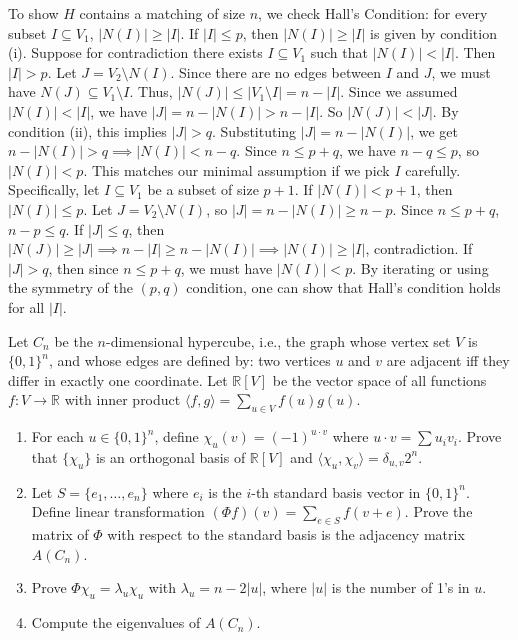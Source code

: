 \begin{solution}
To show $H$ contains a matching of size $n$, we check Hall's Condition: for every subset $I \subseteq V_1$, $|N(I)| \geq |I|$.
If $|I| \leq p$, then $|N(I)| \geq |I|$ is given by condition (i).
Suppose for contradiction there exists $I \subseteq V_1$ such that $|N(I)| < |I|$. Then $|I| > p$.
Let $J = V_2 \setminus N(I)$. Since there are no edges between $I$ and $J$, we must have $N(J) \subseteq V_1 \setminus I$.
Thus, $|N(J)| \leq |V_1 \setminus I| = n - |I|$.
Since we assumed $|N(I)| < |I|$, we have $|J| = n - |N(I)| > n - |I|$.
So $|N(J)| < |J|$. By condition (ii), this implies $|J| > q$.
Substituting $|J| = n - |N(I)|$, we get $n - |N(I)| > q \implies |N(I)| < n - q$.
Since $n \leq p + q$, we have $n - q \leq p$, so $|N(I)| < p$. This matches our minimal assumption if we pick $I$ carefully.
Specifically, let $I \subseteq V_1$ be a subset of size $p+1$. If $|N(I)| < p+1$, then $|N(I)| \leq p$.
Let $J = V_2 \setminus N(I)$, so $|J| = n - |N(I)| \geq n - p$.
Since $n \le p+q$, $n-p \le q$. If $|J| \le q$, then $|N(J)| \ge |J| \implies n - |I| \ge n - |N(I)| \implies |N(I)| \ge |I|$, contradiction.
If $|J| > q$, then since $n \le p+q$, we must have $|N(I)| < p$.
By iterating or using the symmetry of the $(p,q)$ condition, one can show that Hall's condition holds for all $|I|$.
\end{solution}

\begin{exercise}
\label{applied:2018:7}
Let $C_n$ be the $n$-dimensional hypercube, i.e., the graph whose vertex set $V$ is $\{0, 1\}^n$, and whose edges are defined by: two vertices $u$ and $v$ are adjacent iff they differ in exactly one coordinate. Let $\mathbb{R}[V]$ be the vector space of all functions $f: V \to \mathbb{R}$ with inner product $\langle f, g \rangle = \sum_{u \in V} f(u)g(u)$.
\begin{enumerate}
    \item For each $u \in \{0, 1\}^n$, define $\chi_u(v) = (-1)^{u \cdot v}$ where $u \cdot v = \sum u_i v_i$. Prove that $\{\chi_u\}$ is an orthogonal basis of $\mathbb{R}[V]$ and $\langle \chi_u, \chi_v \rangle = \delta_{u, v} 2^n$.
    \item Let $S = \{e_1, \dots, e_n\}$ where $e_i$ is the $i$-th standard basis vector in $\{0, 1\}^n$. Define linear transformation $(\Phi f)(v) = \sum_{e \in S} f(v + e)$. Prove the matrix of $\Phi$ with respect to the standard basis is the adjacency matrix $A(C_n)$.
    \item Prove $\Phi \chi_u = \lambda_u \chi_u$ with $\lambda_u = n - 2|u|$, where $|u|$ is the number of 1's in $u$.
    \item Compute the eigenvalues of $A(C_n)$.
\end{enumerate}
\end{exercise}

